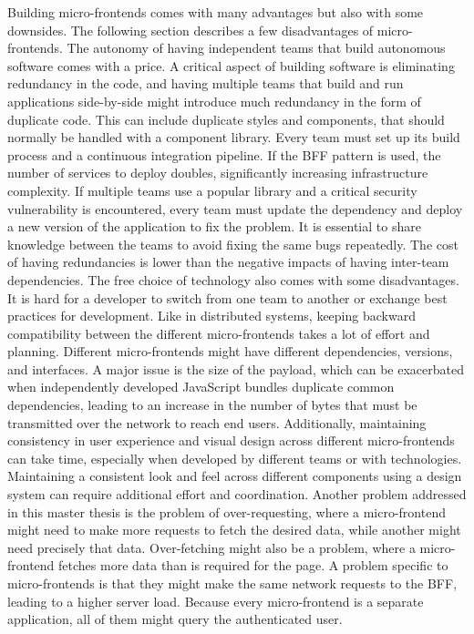 Building micro-frontends comes with many advantages but also with some downsides. The following section describes a few disadvantages of micro-frontends. The autonomy of having independent teams that build autonomous software comes with a price. A critical aspect of building software is eliminating redundancy in the code, and having multiple teams that build and run applications side-by-side might introduce much redundancy in the form of duplicate code. This can include duplicate styles and components, that should normally be handled with a component library. Every team must set up its build process and a continuous integration pipeline. If the \ac{BFF} pattern is used, the number of services to deploy doubles, significantly increasing infrastructure complexity. If multiple teams use a popular library and a critical security vulnerability is encountered, every team must update the dependency and deploy a new version of the application to fix the problem. It is essential to share knowledge between the teams to avoid fixing the same bugs repeatedly. The cost of having redundancies is lower than the negative impacts of having inter-team dependencies. The free choice of technology also comes with some disadvantages. It is hard for a developer to switch from one team to another or exchange best practices for development. Like in distributed systems, keeping backward compatibility between the different micro-frontends takes a lot of effort and planning. Different micro-frontends might have different dependencies, versions, and interfaces.  \cite[17-18]{book:2020:geers:background:micro-frontends:micro-frontends-in-action} A major issue is the size of the payload, which can be exacerbated when independently developed JavaScript bundles duplicate common dependencies, leading to an increase in the number of bytes that must be transmitted over the network to reach end users. Additionally, maintaining consistency in user experience and visual design across different micro-frontends can take time, especially when developed by different teams or with technologies. Maintaining a consistent look and feel across different components using a design system can require additional effort and coordination. \cite{misc:2019:jackson:background:micro-frontends:disadvantages} Another problem addressed in this master thesis is the problem of over-requesting, where a micro-frontend might need to make more requests to fetch the desired data, while another might need precisely that data. Over-fetching might also be a problem, where a micro-frontend fetches more data than is required for the page. A problem specific to micro-frontends is that they might make the same network requests to the \ac{BFF}, leading to a higher server load. Because every micro-frontend is a separate application, all of them might query the authenticated user.








